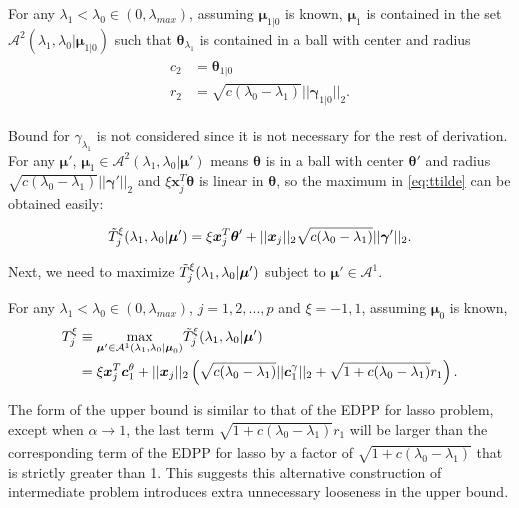 \begin{theorem}
    \label{thm:1.3.alt}
    For any $\lambda_1<\lambda_{0}\in (0,\lambda_{max})$, assuming $\boldsymbol\mu_{1|0}$ is known, $\boldsymbol\mu_1$ is contained in the set $\mathcal{A}^2(\lambda_1,\lambda_0|\boldsymbol\mu_{1|0})$ such that $\boldsymbol\theta_{\lambda_1}$ is contained in a ball with center and radius
    \begin{gather}
        \begin{aligned}
            c_2&=\boldsymbol\theta_{1|0}\\
            r_2&=\sqrt{c(\lambda_0-\lambda_1)}||\boldsymbol\gamma_{1|0}||_2.
        \end{aligned}
    \end{gather}
\end{theorem}
Bound for $\gamma_{\lambda_1}$ is not considered since it is not necessary for the rest of derivation. For any $\boldsymbol\mu'$, $\boldsymbol\mu_1\in\mathcal{A}^2(\lambda_1,\lambda_0|\boldsymbol\mu')$ means $\boldsymbol\theta$ is in a ball with center $\boldsymbol\theta'$ and radius $\sqrt{c(\lambda_0-\lambda_1)}||\boldsymbol\gamma'||_2$ and $\xi \boldsymbol x_j^T\boldsymbol\theta$ is linear in $\boldsymbol\theta$, so the maximum in \eqref{eq:ttilde} can be obtained easily:

\begin{equation}
    \label{eq:ttildexi.alt}
    \Tilde{T}^\xi_j(\lambda_1,\lambda_0|\boldsymbol\mu')=\xi \boldsymbol x_j^T\boldsymbol\theta'+||\boldsymbol x_j||_2\sqrt{c(\lambda_0-\lambda_1)}||\boldsymbol\gamma'||_2.
\end{equation}

Next, we need to maximize $\Tilde{T}^\xi_j(\lambda_1,\lambda_0|\boldsymbol\mu')$ subject to $\boldsymbol\mu'\in\mathcal{A}^1$.

\begin{theorem}
    \label{thm:2.1.alt}
    For any $\lambda_1<\lambda_{0}\in (0,\lambda_{max})$, $j=1,2,...,p$ and $\xi=-1,1$, assuming $\boldsymbol\mu_0$ is known,
    \begin{gather}
        \begin{aligned}
            T^\xi_j&\equiv\underset{\boldsymbol\mu'\in\mathcal{A}^1(\lambda_1,\lambda_0|\boldsymbol\mu_0)}{\mathrm{max}}\Tilde{T}^\xi_j(\lambda_1,\lambda_0|\boldsymbol\mu')\\
            &=\xi \boldsymbol x_j^T \boldsymbol c_1^\theta+||\boldsymbol x_j||_2\left(\sqrt{c(\lambda_0-\lambda_1)}||\boldsymbol c_1^\gamma||_2+\sqrt{1+c(\lambda_0-\lambda_1)}r_1\right).
        \end{aligned}
    \end{gather}
\end{theorem}

The form of the upper bound is similar to that of the EDPP for lasso problem, except when $\alpha\xrightarrow[]{}1$, the last term $\sqrt{1+c(\lambda_0-\lambda_1)}r_1$ will be larger than the corresponding term of the EDPP for lasso by a factor of $\sqrt{1+c(\lambda_0-\lambda_1)}$ that is strictly greater than 1. This suggests this alternative construction of intermediate problem introduces extra unnecessary looseness in the upper bound.